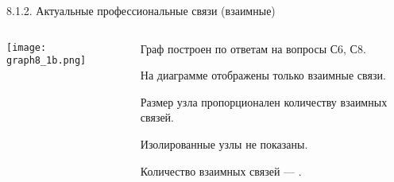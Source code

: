 \begin{frame}{8.1.2. Актуальные профессиональные связи (взаимные)}

\begin{columns}
\begin{column}{0.75\textwidth} 
\centering
          \texttt{[image: graph8\_1b.png]}
\end{column}
\begin{column}{0.25\textwidth} 

\tiny
Граф построен по ответам на вопросы С6, С8.
\smallskip

На диаграмме отображены только взаимные связи.
\smallskip

Размер узла пропорционален количеству взаимных связей.
\smallskip

Изолированные узлы не показаны.
\bigskip

Количество взаимных связей --- \valHABlinks.


\end{column}
\end{columns}
\end{frame}


